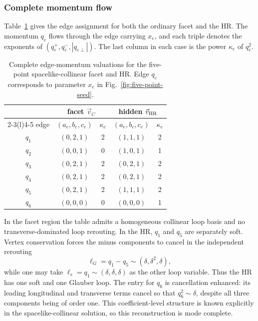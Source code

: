 \documentclass[a4paper,11pt]{article}
\newcommand{\vHR}{\vec v_{\rm HR}}
\begin{document}
\subsubsection*{Complete momentum flow}

Table~\ref{tab:five-sc-edge-flow} gives the edge assignment for both the
ordinary facet and the HR.  The momentum \(q_e\) flows through the edge
carrying \(x_e\), and each triple denotes the exponents of
\((q_e^+,q_e^-,|q_{e\perp}|)\).  The last column in each case is the power
\(\kappa_e\) of \(q_e^2\).
\begin{table}[htbp]
\centering
\small
\begin{tabular}{@{}c cc cc@{}}
\toprule
& \multicolumn{2}{c}{facet \(\vec v_C\)}
& \multicolumn{2}{c}{hidden \(\vHR\)}\\
\cmidrule(lr){2-3}\cmidrule(l){4-5}
edge & \((a_e,b_e,c_e)\) & \(\kappa_e\)
     & \((a_e,b_e,c_e)\) & \(\kappa_e\)\\
\midrule
\(q_1\) & \((0,2,1)\) & 2 & \((1,1,1)\) & 2\\
\(q_2\) & \((0,0,1)\) & 0 & \((1,0,1)\) & 1\\
\(q_3\) & \((0,2,1)\) & 2 & \((0,2,1)\) & 2\\
\(q_4\) & \((0,2,1)\) & 2 & \((0,2,1)\) & 2\\
\(q_5\) & \((0,2,1)\) & 2 & \((1,1,1)\) & 2\\
\(q_6\) & \((0,0,0)\) & 0 & \((0,0,0)\) & 1\\
\bottomrule
\end{tabular}
\caption{Complete edge-momentum valuations for the five-point
spacelike-collinear facet and HR.  Edge \(q_e\) corresponds to parameter
\(x_e\) in Fig.~\ref{fig:five-point-seed}.}
\label{tab:five-sc-edge-flow}
\end{table}

In the facet region the table admits a homogeneous collinear loop basis and
no transverse-dominated loop rerouting.  In the HR, \(q_1\) and \(q_5\) are
separately soft.  Vertex conservation forces the minus components to cancel
in the independent rerouting
\begin{equation}
 \ell_G=q_1-q_5\sim(\delta,\delta^2,\delta),
 \label{eq:five-sc-glauber-rerouting}
\end{equation}
while one may take \(\ell_s=q_1\sim(\delta,\delta,\delta)\) as the other
loop variable.  Thus the HR has one soft and one Glauber loop.  The entry for
\(q_6\) is cancellation enhanced: its leading longitudinal and transverse
terms cancel so that \(q_6^2\sim\delta\), despite all three components being
of order one.  This coefficient-level structure is known explicitly in the
spacelike-collinear solution, so this reconstruction is mode complete.
\end{document}
